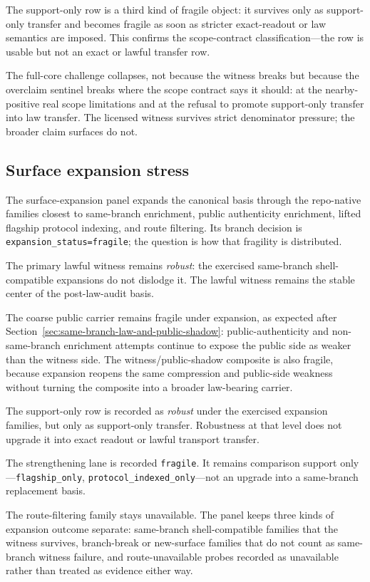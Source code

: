 \documentclass[11pt]{article}
\theoremstyle{definition}
\begin{document}
The support-only row is a third kind of fragile object: it survives only as
support-only transfer and becomes fragile as soon as stricter exact-readout or law
semantics are imposed. This confirms the scope-contract classification---the row is
usable but not an exact or lawful transfer row.

The full-core challenge collapses, not because the witness breaks but because the
overclaim sentinel breaks where the scope contract says it should: at the
nearby-positive real scope limitations and at the refusal to promote support-only
transfer into law transfer. The licensed witness survives strict denominator pressure;
the broader claim surfaces do not.

\subsection{Surface expansion stress}

The surface-expansion panel expands the canonical basis through the repo-native
families closest to same-branch enrichment, public authenticity enrichment, lifted
flagship protocol indexing, and route filtering. Its branch decision is
\texttt{expansion\_status=fragile}; the question is how that fragility is
distributed.

The primary lawful witness remains \emph{robust}: the exercised same-branch
shell-compatible expansions do not dislodge it. The lawful witness remains the stable
center of the post-law-audit basis.

The coarse public carrier remains fragile under expansion, as expected after
Section~\ref{sec:same-branch-law-and-public-shadow}: public-authenticity and
non-same-branch enrichment attempts continue to expose the public side as weaker than
the witness side. The witness/public-shadow composite is also fragile, because
expansion reopens the same compression and public-side weakness without turning the
composite into a broader law-bearing carrier.

The support-only row is recorded as \emph{robust} under the exercised expansion
families, but only as support-only transfer. Robustness at that level does not upgrade
it into exact readout or lawful transport transfer.

The strengthening lane is recorded \texttt{fragile}. It remains comparison support
only---\texttt{flagship\_only}, \texttt{protocol\_indexed\_only}---not an upgrade into
a same-branch replacement basis.

The route-filtering family stays unavailable. The panel keeps three kinds of expansion
outcome separate: same-branch shell-compatible families that the witness survives,
branch-break or new-surface families that do not count as same-branch witness failure,
and route-unavailable probes recorded as unavailable rather than treated as evidence
either way.
\end{document}
